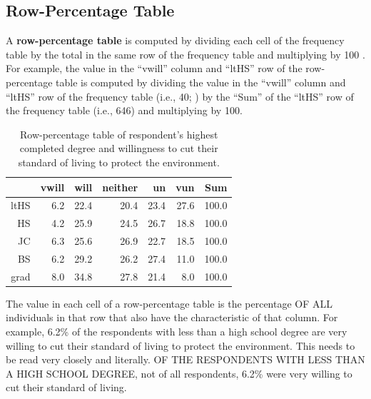 \documentclass[10pt,openany]{book}\usepackage[]{graphicx}\usepackage[]{color}
\begin{document}
\subsection{Row-Percentage Table}
\vspace{-12pt}
A \textbf{row-percentage table} is computed by dividing each cell of the frequency table by the total in the same row of the frequency table and multiplying by 100 .  For example, the value in the ``vwill'' column and ``ltHS'' row of the row-percentage table is computed by dividing the value in the ``vwill'' column and ``ltHS'' row of the frequency table (i.e., 40; ) by the ``Sum'' of the ``ltHS'' row of the frequency table (i.e., 646) and multiplying by 100.

\begin{table}[ht]
\centering
\caption{Row-percentage table of respondent's highest completed degree and willingness to cut their standard of living to protect the environment.} 
\label{tab:EnvRowP}
\begin{tabular}{rrrrrrr}
  \hline
 & vwill & will & neither & un & vun & Sum \\ 
  \hline
ltHS & 6.2 & 22.4 & 20.4 & 23.4 & 27.6 & 100.0 \\ 
  HS & 4.2 & 25.9 & 24.5 & 26.7 & 18.8 & 100.0 \\ 
  JC & 6.3 & 25.6 & 26.9 & 22.7 & 18.5 & 100.0 \\ 
  BS & 6.2 & 29.2 & 26.2 & 27.4 & 11.0 & 100.0 \\ 
  grad & 8.0 & 34.8 & 27.8 & 21.4 & 8.0 & 100.0 \\ 
   \hline
\end{tabular}
\end{table}


The value in each cell of a row-percentage table is the percentage OF ALL individuals in that row that also have the characteristic of that column.  For example, 6.2\% of the respondents with less than a high school degree are very willing to cut their standard of living to protect the environment.  This needs to be read very closely and literally.  OF THE RESPONDENTS WITH LESS THAN A HIGH SCHOOL DEGREE, not of all respondents, 6.2\% were very willing to cut their standard of living.

\end{document}
